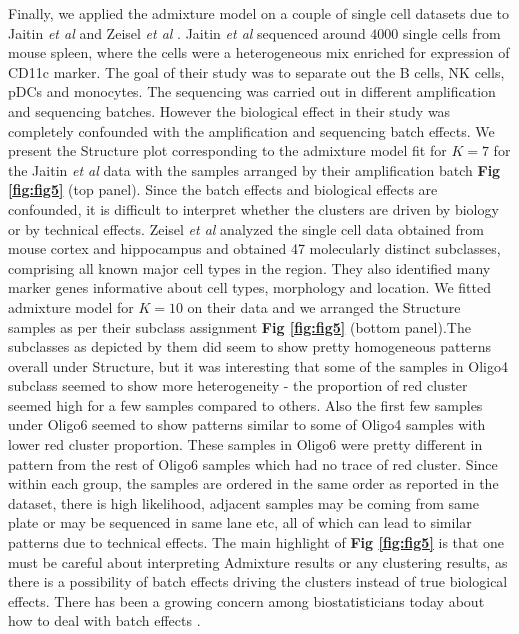 Finally, we applied the admixture model on a couple of single cell datasets due to Jaitin \textit{et al} \cite{Jaitin2014} and Zeisel \textit{et al} \cite{Zeisel2015}.  Jaitin \textit{et al} sequenced around $4000$ single cells from mouse spleen, where the cells were a heterogeneous mix enriched for expression of CD11c marker.  The goal of their study was to separate out the B cells, NK cells, pDCs and monocytes. The sequencing was carried out in different amplification and sequencing batches. However the biological effect in their study was completely confounded with the amplification and sequencing batch effects. We present the Structure plot corresponding to the admixture model fit for $K=7$ for the Jaitin \textit{et al} data with the samples arranged by their amplification batch \textbf{Fig \ref{fig:fig5}} (top panel). Since the batch effects and  biological effects are confounded, it is difficult to interpret whether the clusters are driven by biology or by technical effects. Zeisel \textit{et al} analyzed the single cell data obtained from mouse cortex and hippocampus and obtained 47 molecularly distinct subclasses, comprising all known major cell types in the region. They also identified many marker genes informative about cell types, morphology and location. We fitted admixture model for $K=10$ on their data and we arranged the Structure samples as per their subclass assignment \textbf{Fig \ref{fig:fig5}} (bottom panel).The subclasses as depicted by them did seem to show pretty homogeneous patterns overall under Structure, but it was interesting that some of the samples in Oligo4 subclass seemed to show more heterogeneity - the proportion of red cluster seemed high for a few samples compared to others. Also the first few samples under Oligo6 seemed to show patterns similar to some of Oligo4 samples with lower red cluster proportion. These samples in Oligo6 were pretty different in pattern from the rest of Oligo6 samples which had no trace of red cluster. Since within each group, the samples are ordered in the same order as reported in the dataset, there is high likelihood, adjacent samples may be coming from same plate or may be sequenced in same lane etc, all of which can lead to similar patterns due to technical effects. The main highlight of \textbf{Fig \ref{fig:fig5}} is that one must be careful about interpreting Admixture results or any clustering results, as there is a possibility of batch effects driving the clusters instead of true biological effects. There has been a growing concern among biostatisticians today about how to deal with batch effects \cite{Leek2010} \cite{Hicks2015}. 








